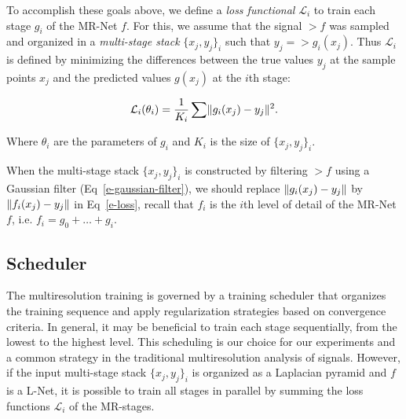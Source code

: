 To accomplish these goals above, we define a \emph{loss functional} $\mathcal{L}_i$ to train each stage $g_i$ of the MR-Net $f$. For this, we assume that the signal $\gt{f}$ was sampled and organized in a \textit{multi-stage stack} $\{x_j, y_j\}_i$ such that $y_j=\gt{g}_i(x_j)$. Thus $\mathcal{L}_i$ is defined by minimizing the differences between the true values $y_j$ at the sample points $x_j$ and the predicted values $g(x_j)$ at the $i$th stage: 

\begin{align}\label{e-loss}
    \mathcal{L}_i(\theta_i)=\frac{1}{K_i}\sum \lVert g_i(x_j)-y_j\rVert^2.
\end{align}

Where $\theta_i$ are the parameters of $g_i$ and $K_i$ is the size of $\{x_j, y_j\}_i$.

When the multi-stage stack $\{x_j, y_j\}_i$ is constructed by filtering $\gt{f}$ using a Gaussian filter (Eq~\ref{e-gaussian-filter}), we should replace $\lVert g_i(x_j)-y_j\rVert$ by $\lVert f_i(x_j)-y_j\rVert$ in Eq~\ref{e-loss}, recall that $f_i$ is the $i$th level of detail of the MR-Net $f$, i.e. $f_i=g_0+\dots+g_{i}$.





\subsection{Scheduler}

The multiresolution training is governed by a training scheduler that organizes the training sequence and apply regularization strategies based on convergence criteria. In general, it may be beneficial to train each stage sequentially, from the lowest to the highest level. This scheduling is our choice for our experiments and a common strategy in the traditional multiresolution analysis of signals. However, if the input multi-stage stack $\{x_j, y_j\}_i$ is organized as a Laplacian pyramid and $f$ is a L-Net, it is possible to train all stages in parallel by summing the loss functions $\mathcal{L}_i$ of the MR-stages. 


